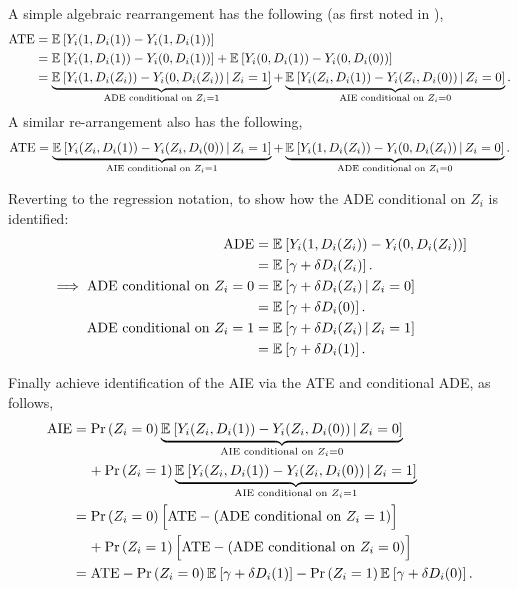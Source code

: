 A simple algebraic rearrangement has the following (as first noted in \citealt[Section~3.1]{imai2010identification}),
\begin{align*}
    \text{ATE} &= \mathbb{E}_{} \left[ Y_i(1, D_i(1)) - Y_i(1, D_i(1)) \right] \\
    &= \mathbb{E}_{} \left[  Y_i(1, D_i(1)) - Y_i(0, D_i(1)) \right]
    +  \mathbb{E}_{} \left[  Y_i(0, D_i(1)) - Y_i(0, D_i(0)) \right] \\
    &= \underbrace{\mathbb{E}_{} \left[  Y_i(1, D_i(Z_i)) - Y_i(0, D_i(Z_i)) \, \middle\vert \,  Z_i = 1 \right]}_{
        \text{ADE conditional on } Z_i = 1}
    +  \underbrace{\mathbb{E}_{} \left[  Y_i(Z_i, D_i(1)) - Y_i(Z_i, D_i(0)) \, \middle\vert \,  Z_i = 0 \right]}_{
        \text{AIE conditional on } Z_i = 0}.
\end{align*}
A similar re-arrangement also has the following,
\[ \text{ATE} 
    = \underbrace{\mathbb{E}_{} \left[  Y_i(Z_i, D_i(1)) - Y_i(Z_i, D_i(0)) \, \middle\vert \,  Z_i = 1 \right]}_{
        \text{AIE conditional on } Z_i = 1}
    + \underbrace{\mathbb{E}_{} \left[  Y_i(1, D_i(Z_i)) - Y_i(0, D_i(Z_i)) \, \middle\vert \,  Z_i = 0 \right]}_{
        \text{ADE conditional on } Z_i = 0}. \]

Reverting to the regression notation, to show how the ADE conditional on $Z_i$ is identified:
\begin{align*}
    \text{ADE} &= \mathbb{E}_{} \left[  Y_i(1, D_i(Z_i)) - Y_i(0, D_i(Z_i)) \right] \\
        &= \mathbb{E}_{} \left[  \gamma + \delta D_i(Z_i)  \right]. \\
    \implies \text{ADE conditional on } Z_i = 0
        &= \mathbb{E}_{} \left[  \gamma + \delta D_i(Z_i)  \, \middle\vert \, Z_i = 0 \right] \\
        &= \mathbb{E}_{} \left[  \gamma + \delta D_i(0)  \right]. \\
    \text{ADE conditional on } Z_i = 1
        &= \mathbb{E}_{} \left[  \gamma + \delta D_i(Z_i)  \, \middle\vert \, Z_i = 1 \right] \\
        &= \mathbb{E}_{} \left[  \gamma + \delta D_i(1)  \right].
\end{align*}

Finally achieve identification of the AIE via the ATE and conditional ADE, as follows,
\begin{align*}
    \text{AIE}
    &= \Pr\left( Z_i = 0 \right)
    \underbrace{\mathbb{E}_{} \left[  Y_i(Z_i, D_i(1)) - Y_i(Z_i, D_i(0)) \, \middle\vert \,  Z_i = 0 \right]}_{
        \text{AIE conditional on } Z_i = 0} \\
    &\;\;\;\;+ \Pr\left( Z_i = 1 \right)
    \underbrace{\mathbb{E}_{} \left[  Y_i(Z_i, D_i(1)) - Y_i(Z_i, D_i(0)) \, \middle\vert \,  Z_i = 1 \right]}_{
        \text{AIE conditional on } Z_i = 1} \\
    &= \Pr\left( Z_i = 0 \right) \Big[
        \text{ATE} - (\text{ADE conditional on } Z_i = 1) \Big] \\
    &\;\;\;\;+ \Pr\left( Z_i = 1 \right) \Big[
        \text{ATE} - (\text{ADE conditional on } Z_i = 0) \Big] \\
    &= \text{ATE} - \Pr\left( Z_i = 0 \right) \mathbb{E}_{} \left[  \gamma + \delta D_i(1)  \right]
        - \Pr\left( Z_i = 1 \right) \mathbb{E}_{} \left[  \gamma + \delta D_i(0)  \right].
\end{align*}

